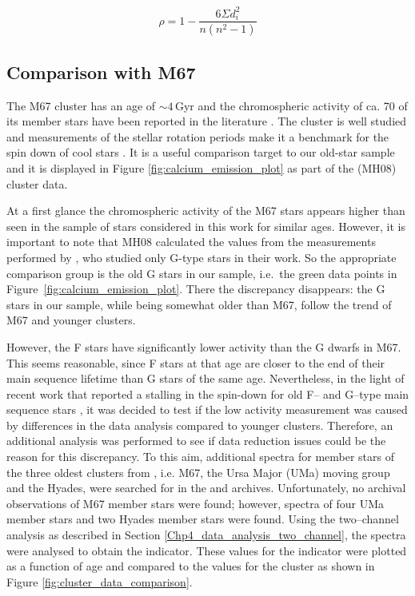 \begin{equation}
    \rho = 1 - \frac{6\Sigma d_{i}^{2}}{n(n^{2}-1)}
    \label{Eq:spearman_rank_coeff}
\end{equation}

\subsection{Comparison with M67}
The M67 cluster has an age of $\sim 4$\,Gyr \citep{Demarque_etal_1992,VandenBerg_Stetson_2004,Bellini_etal_2010} and the chromospheric activity of ca. 70 of its member stars have been reported in the literature \citep{Giampapa_etal_2006,Mamajek_Hillenbrand_2008}. The cluster is well studied and measurements of the stellar rotation periods make it a benchmark for the spin down of cool stars \citep{Barnes_etal_2016}. It is a useful comparison target to our old-star sample and it is displayed in Figure \ref{fig:calcium_emission_plot} as part of the \citet{Mamajek_Hillenbrand_2008} (MH08) cluster data.

At a first glance the chromospheric activity of the M67 stars appears higher than seen in the sample of stars considered in this work for similar ages. However, it is important to note that MH08 calculated the \Rprime values from the measurements performed by \citet{Giampapa_etal_2006}, who studied only G-type stars in their work. So the appropriate comparison group is the old G stars in our sample, i.e.\ the green data points in Figure~\ref{fig:calcium_emission_plot}. There the discrepancy disappears: the G stars in our sample, while being somewhat older than M67, follow the trend of M67 and younger clusters.

However, the F stars have significantly lower activity than the G dwarfs in M67. This seems reasonable, since F stars at that age are closer to the end of their main sequence lifetime than G stars of the same age. Nevertheless, in the light of recent work that reported a stalling in the spin-down for old F-- and G--type main sequence stars \citep{van_Saders_etal_2016}, it was decided to test if the low activity measurement was caused by differences in the data analysis compared to younger clusters. Therefore, an additional analysis was performed to see if data reduction issues could be the reason for this discrepancy. To this aim, additional spectra for member stars of the three oldest clusters from \citet{Mamajek_Hillenbrand_2008}, i.e. M67, the Ursa Major (UMa) moving group and the Hyades, were searched for in the \esp and \narval archives. Unfortunately, no archival observations of M67 member stars were found; however, spectra of four UMa member stars and two Hyades member stars were found. Using the two--channel analysis as described in Section \ref{Chp4_data_analysis_two_channel}, the spectra were analysed to obtain the \Rprime indicator. These values for the \Rprime indicator were plotted as a function of age and compared to the \citet{Mamajek_Hillenbrand_2008} values for the cluster as shown in Figure \ref{fig:cluster_data_comparison}. 

